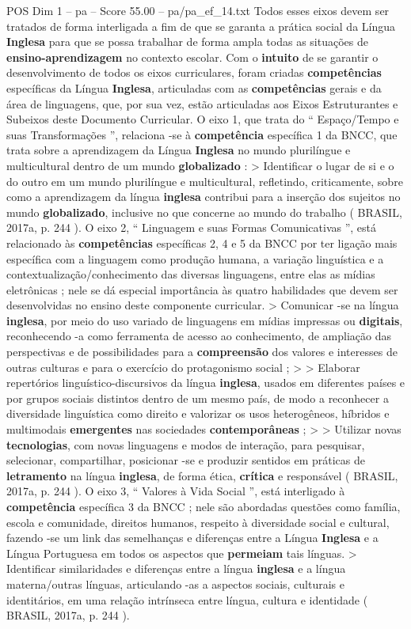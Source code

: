 \begin{textsample}{POS Dim 1 – pa – Score 55.00 – pa/pa\_ef\_14.txt}
Todos esses eixos devem ser tratados de forma interligada a fim de que se garanta a prática social da Língua \textbf{Inglesa} para que se possa trabalhar de forma ampla todas as situações de \textbf{ensino-aprendizagem} no contexto escolar.
Com o \textbf{intuito} de se garantir o desenvolvimento de todos os eixos curriculares, foram criadas \textbf{competências} específicas da Língua \textbf{Inglesa}, articuladas com as \textbf{competências} gerais e da área de linguagens, que, por sua vez, estão articuladas aos Eixos Estruturantes e Subeixos deste Documento Curricular.
O eixo 1, que trata do “ Espaço/Tempo e suas Transformações ”, relaciona -se à \textbf{competência} específica 1 da BNCC, que trata sobre a aprendizagem da Língua \textbf{Inglesa} no mundo plurilíngue e multicultural dentro de um mundo \textbf{globalizado} : > Identificar o lugar de si e o do outro em um mundo plurilíngue e multicultural, refletindo, criticamente, sobre como a aprendizagem da língua \textbf{inglesa} contribui para a inserção dos sujeitos no mundo \textbf{globalizado}, inclusive no que concerne ao mundo do trabalho ( BRASIL, 2017a, p. 244 ).
O eixo 2, “ Linguagem e suas Formas Comunicativas ”, está relacionado às \textbf{competências} específicas 2, 4 e 5 da BNCC por ter ligação mais específica com a linguagem como produção humana, a variação linguística e a contextualização/conhecimento das diversas linguagens, entre elas as mídias eletrônicas ; nele se dá especial importância às quatro habilidades que devem ser desenvolvidas no ensino deste componente curricular. > Comunicar -se na língua \textbf{inglesa}, por meio do uso variado de linguagens em mídias impressas ou \textbf{digitais}, reconhecendo -a como ferramenta de acesso ao conhecimento, de ampliação das perspectivas e de possibilidades para a \textbf{compreensão} dos valores e interesses de outras culturas e para o exercício do protagonismo social ; > > Elaborar repertórios linguístico-discursivos da língua \textbf{inglesa}, usados em diferentes países e por grupos sociais distintos dentro de um mesmo país, de modo a reconhecer a diversidade linguística como direito e valorizar os usos heterogêneos, híbridos e multimodais \textbf{emergentes} nas sociedades \textbf{contemporâneas} ; > > Utilizar novas \textbf{tecnologias}, com novas linguagens e modos de interação, para pesquisar, selecionar, compartilhar, posicionar -se e produzir sentidos em práticas de \textbf{letramento} na língua \textbf{inglesa}, de forma ética, \textbf{crítica} e responsável ( BRASIL, 2017a, p. 244 ).
O eixo 3, “ Valores à Vida Social ”, está interligado à \textbf{competência} específica 3 da BNCC ; nele são abordadas questões como família, escola e comunidade, direitos humanos, respeito à diversidade social e cultural, fazendo -se um link das semelhanças e diferenças entre a Língua \textbf{Inglesa} e a Língua Portuguesa em todos os aspectos que \textbf{permeiam} tais línguas. > Identificar similaridades e diferenças entre a língua \textbf{inglesa} e a língua materna/outras línguas, articulando -as a aspectos sociais, culturais e identitários, em uma relação intrínseca entre língua, cultura e identidade ( BRASIL, 2017a, p. 244 ).

\end{textsample}
